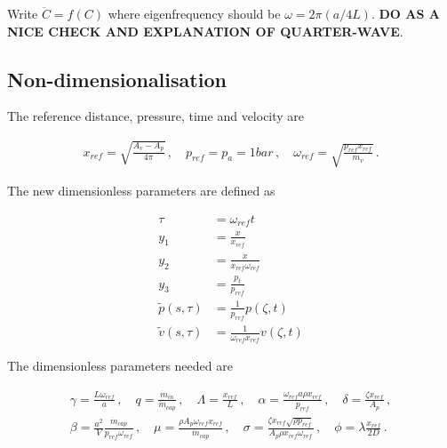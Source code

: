 Write $\ddot{C} = f(C)$ where eigenfrequency should be $\omega = 2\pi\left( a / 4L \right)$. \textbf{DO AS A NICE CHECK AND EXPLANATION OF QUARTER-WAVE}.

\subsection{Non-dimensionalisation}

The reference distance, pressure, time and velocity are

\begin{equation*}
\begin{split}
    x_{ref} = \sqrt{\frac{A_v - A_p}{4 \pi}}
    \, , \quad
    p_{ref} = p_a = 1 \si{bar}
    \, , \quad
    \omega_{ref} = \sqrt{\frac{p_{ref} x_{ref}}{m_v}} \, .
\end{split}
\end{equation*}

The new dimensionless parameters are defined as

\begin{equation*}
\begin{split}
    \tau &= \omega_{ref} t \\
    y_1 &= \frac{x}{x_{ref}} \\
    y_2 &= \frac{\dot{x}}{x_{ref} \omega_{ref}} \\
    y_3 &= \frac{p_t}{p_{ref}} \\
    \tilde{p}(s,\tau) &= \frac{1}{p_{ref}} p(\zeta,t) \\
    \tilde{v}(s,\tau) &= \frac{1}{\omega_{ref} x_{ref}} v(\zeta,t) 
\end{split}
\end{equation*}

The dimensionless parameters needed are

\begin{equation*}
\begin{split}
    \gamma = \frac{L \omega_{ref}}{a} \, , \quad
    q = \frac{\dot{m}_{in}}{\dot{m}_{cap}} \, , \quad
    \Lambda = \frac{x_{ref}}{L} \, , \quad
    \alpha = \frac{\omega_{ref} a \rho x_{ref}}{p_{ref}} \, , \quad
    \delta = \frac{\zeta x_{ref}}{A_p}
    \, , \\ %
    \beta = \frac{a^2}{V} \frac{\dot{m}_{cap}}{p_{ref} \omega_{ref}} \, , \quad
    \mu = \frac{\rho A_p \omega_{ref} x_{ref}}{\dot{m}_{cap}} \, , \quad
    \sigma = \frac{\zeta x_{ref} \sqrt{\rho p_{ref}}}{A_p \rho x_{ref} \omega_{ref}} \, , \quad
    \phi = \lambda \frac{x_{ref}}{2D} \, .
\end{split}
\end{equation*}

